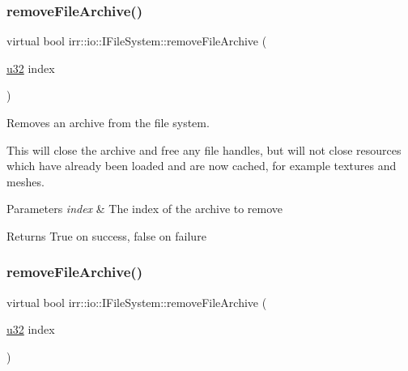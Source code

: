 \subsubsection{\texorpdfstring{remove\+File\+Archive()}{removeFileArchive()}\hspace{0.1cm}{\footnotesize\ttfamily [1/6]}}
{\footnotesize\ttfamily virtual bool irr\+::io\+::\+I\+File\+System\+::remove\+File\+Archive (\begin{DoxyParamCaption}\item[{\hyperlink{namespaceirr_a0416a53257075833e7002efd0a18e804}{u32}}]{index }\end{DoxyParamCaption})\hspace{0.3cm}{\ttfamily [pure virtual]}}



Removes an archive from the file system. 

This will close the archive and free any file handles, but will not close resources which have already been loaded and are now cached, for example textures and meshes. 
\begin{DoxyParams}{Parameters}
{\em index} & The index of the archive to remove \\
\hline
\end{DoxyParams}
\begin{DoxyReturn}{Returns}
True on success, false on failure 
\end{DoxyReturn}
\mbox{\label{classirr_1_1io_1_1IFileSystem_aa509623756c9bcbc3a9bcf455ea2a3ba}} 
\subsubsection{\texorpdfstring{remove\+File\+Archive()}{removeFileArchive()}\hspace{0.1cm}{\footnotesize\ttfamily [2/6]}}
{\footnotesize\ttfamily virtual bool irr\+::io\+::\+I\+File\+System\+::remove\+File\+Archive (\begin{DoxyParamCaption}\item[{\hyperlink{namespaceirr_a0416a53257075833e7002efd0a18e804}{u32}}]{index }\end{DoxyParamCaption})\hspace{0.3cm}{\ttfamily [pure virtual]}}



